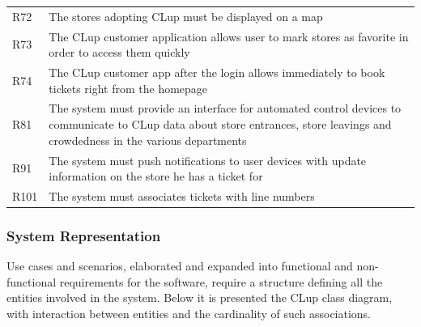 \begin{tabular}{C{1cm}L{14.1cm}}
    R72   & The stores adopting CLup must be displayed on a map                                                                                                                             \\
    R73   & The CLup customer application allows user to mark stores as favorite in order to access them quickly                                                                            \\
    R74   & The CLup customer app after the login allows immediately to book tickets right from the homepage                                                                                \\
    R81   & The system must provide an interface for automated control devices to communicate to CLup data about store entrances, store leavings and crowdedness in the various departments \\
    R91   & The system must push notifications to user devices with update information on the store he has a ticket for                                                                     \\
    R101  & The system must associates tickets with line numbers                                                                                                                            \\
\end{tabular}
\vfill

\subsubsection{System Representation}

Use cases and scenarios, elaborated and expanded into functional and non-functional requirements for the software, require a structure defining all the entities involved in the system.
Below it is presented the CLup class diagram, with interaction between entities and the cardinality of such associations.

